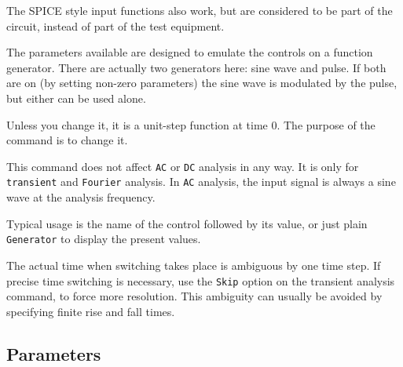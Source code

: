The SPICE style input functions also work, but are considered to
be part of the circuit, instead of part of the test equipment.

The parameters available are designed to emulate the controls on a function
generator.  There are actually two generators here: sine wave and pulse.  If
both are on (by setting non-zero parameters) the sine wave is modulated by
the pulse, but either can be used alone.

Unless you change it, it is a unit-step function at time 0.  The purpose of
the command is to change it.

This command does not affect {\tt AC} or {\tt DC} analysis in any way.  It
is only for {\tt transient} and {\tt Fourier} analysis.  In {\tt AC}
analysis, the input signal is always a sine wave at the analysis frequency.

Typical usage is the name of the control followed by its value, or just plain
{\tt Generator} to display the present values.

The actual time when switching takes place is ambiguous by one time step.  If
precise time switching is necessary, use the {\tt Skip} option on the
transient analysis command, to force more resolution.  This ambiguity can
usually be avoided by specifying finite rise and fall times.
\subsection{Parameters}

